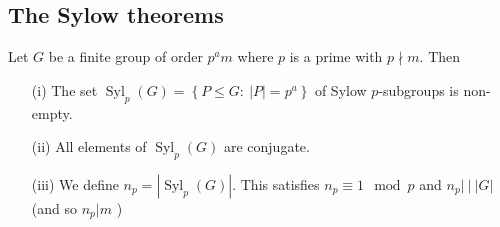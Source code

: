 \documentclass[egregdoesnotlikesansseriftitles,a4paper]{scrartcl}
\begin{document}
\subsection{The Sylow theorems}
\begin{theorem}\label{sylow}
      Let $G$ be a finite group of order $p^{a}m$ where $p$ is a prime with $p \nmid m$. Then 
      \begin{itemize}
           \item[(i)] The set $\operatorname{Syl}_{p}(G)=\left\{P \leq G: \ |P|=p^{a}\right\}$ of Sylow $p$-subgroups is non-empty.
           \item[(ii)] All elements of $\operatorname{Syl}_{p}(G)$ are conjugate.
           \item[(iii)] We define $n_{p} =|\operatorname{Syl}_{p}(G)|$. This satisfies $n_{p} \equiv 1 \mod p$ and $n_{p}| \ |\ |G|$ (and so $n_{p}|m$ )
      \end{itemize}
\end{theorem}
\end{document}

